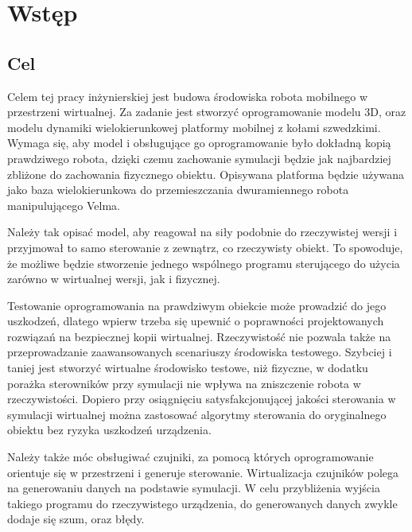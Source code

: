 \chapter{Wstęp}
\section{Cel}
Celem tej pracy inżynierskiej jest budowa środowiska robota mobilnego w przestrzeni wirtualnej.
Za zadanie jest stworzyć oprogramowanie modelu 3D, oraz modelu dynamiki wielokierunkowej platformy mobilnej z kołami szwedzkimi. 
Wymaga się, aby model i obsługujące go oprogramowanie było dokładną kopią prawdziwego robota, dzięki czemu zachowanie symulacji będzie jak najbardziej zbliżone do zachowania fizycznego obiektu.
Opisywana platforma będzie używana jako baza wielokierunkowa do przemieszczania dwuramiennego robota manipulującego Velma.

Należy tak opisać model, aby reagował na siły podobnie do rzeczywistej wersji i przyjmował to samo sterowanie z zewnątrz, co rzeczywisty obiekt.
To spowoduje, że możliwe będzie stworzenie jednego wspólnego programu sterującego do użycia zarówno w wirtualnej wersji, jak i fizycznej.

Testowanie oprogramowania na prawdziwym obiekcie może prowadzić do jego uszkodzeń, dlatego wpierw trzeba się upewnić o poprawności projektowanych rozwiązań na bezpiecznej kopii wirtualnej.
Rzeczywistość nie pozwala także na przeprowadzanie zaawansowanych scenariuszy środowiska testowego.
Szybciej i taniej jest stworzyć wirtualne środowisko testowe, niż fizyczne, w dodatku porażka sterowników przy symulacji nie wpływa na zniszczenie robota w rzeczywistości.
Dopiero przy osiągnięciu satysfakcjonującej jakości sterowania w symulacji wirtualnej można zastosować algorytmy sterowania do oryginalnego obiektu bez ryzyka uszkodzeń urządzenia.

Należy także móc obsługiwać czujniki, za pomocą których oprogramowanie orientuje się w przestrzeni i generuje sterowanie.
Wirtualizacja czujników polega na generowaniu danych na podstawie symulacji.
W celu przybliżenia wyjścia takiego programu do rzeczywistego urządzenia, do generowanych danych zwykle dodaje się szum, oraz błędy.
